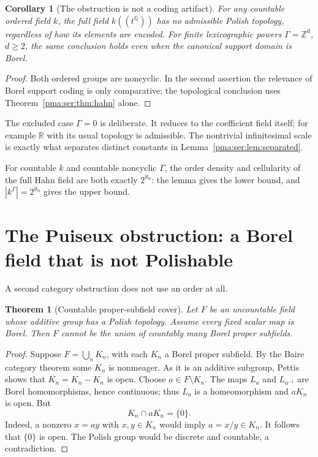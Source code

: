 \documentclass[11pt]{article}
\numberwithin{equation}{section}
\newtheorem{theorem}{Theorem}[section]
\newtheorem{corollary}[corollary]{Corollary}
\theoremstyle{definition}
\theoremstyle{remark}
\newcommand{\Z}{\mathbb Z}
\newcommand{\Q}{\mathbb Q}
\newcommand{\R}{\mathbb R}
\begin{document}
\begin{corollary}[The obstruction is not a coding artifact]
For any countable ordered field $k$, the full field $k((t^\Q))$ has no
admissible Polish topology, regardless of how its elements are encoded.
For finite lexicographic powers $\Gamma=\Z^d$, $d\geq2$, the same conclusion
holds even when the canonical support domain is Borel.
\end{corollary}
\begin{proof}
Both ordered groups are noncyclic. In the second assertion the relevance of
Borel support coding is only comparative; the topological conclusion uses
Theorem~\ref{pma:ser:thm:hahn} alone.
\end{proof}

The excluded case $\Gamma=0$ is deliberate. It reduces to the coefficient
field itself; for example $\R$ with its usual topology is admissible. The
nontrivial infinitesimal scale is exactly what separates distinct constants
in Lemma~\ref{pma:ser:lem:separated}.

For countable $k$ and countable noncyclic $\Gamma$, the order density and
cellularity of the full Hahn field are both exactly $2^{\aleph_0}$: the lemma
gives the lower bound, and $|k^\Gamma|=2^{\aleph_0}$ gives the upper bound.

\section{The Puiseux obstruction: a Borel field that is not Polishable}
\label{pma:ser:sec:puiseux}

A second category obstruction does not use an order at all.

\begin{theorem}[Countable proper-subfield cover]\label{pma:ser:thm:cover}
Let $F$ be an uncountable field whose additive group has a Polish topology.
Assume every fixed scalar map is Borel. Then $F$ cannot be the union of
countably many Borel proper subfields.
\end{theorem}
\begin{proof}
Suppose $F=\bigcup_n K_n$, with each $K_n$ a Borel proper subfield.
By the Baire category theorem some $K_n$ is nonmeager. As it is an additive
subgroup, Pettis shows that $K_n=K_n-K_n$ is open.
Choose $a\in F\setminus K_n$. The maps $L_a$ and $L_{a^{-1}}$ are Borel
homomorphisms, hence continuous; thus $L_a$ is a homeomorphism and $aK_n$ is
open. But
\[
 K_n\cap aK_n=\{0\}.
\]
Indeed, a nonzero $x=ay$ with $x,y\in K_n$ would imply $a=x/y\in K_n$.
It follows that $\{0\}$ is open. The Polish group would be discrete and
countable, a contradiction.
\end{proof}
\end{document}
